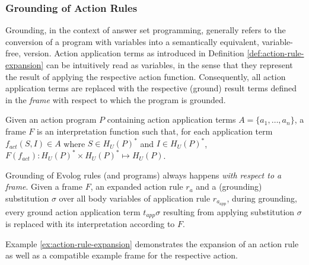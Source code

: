 \subsubsection{Grounding of Action Rules}
\label{subsubsec:evolog-actions-semantics-grounding}

Grounding, in the context of answer set programming, generally refers to the conversion of a program with variables into a semantically equivalent, variable-free, version. Action application terms as introduced in Definition \ref{def:action-rule-expansion} can be intuitively read as variables, in the sense that they represent the result of applying the respective action function. Consequently, all action application terms are replaced with the respective (ground) result terms defined in the \emph{frame} with respect to which the program is grounded.

\begin{definition}[Frame]
\label{def:evolog-frame}
Given an action program $P$ containing action application terms $A = \{a_1,\ldots,a_n\}$, a frame $F$ is an interpretation function such that, for each application term $f_{act}(S, I) \in A$ where $S \in H_{U}(P)^{*}$ and $I \in H_{U}(P)^{*}$, $F(f_{act}): H_{U}(P)^{*} \times H_{U}(P)^{*} \mapsto H_{U}(P)$.
\end{definition}

\begin{definition}
\label{def:evolog-grounding}
Grounding of Evolog rules (and programs) always happens \emph{with respect to a frame}. Given a frame $F$, an expanded action rule $r_a$ and a (grounding) substitution $\sigma$ over all body variables of application rule $r_{a_{app}}$, during grounding, every ground action application term $t_{app}\sigma$ resulting from applying substitution $\sigma$ is replaced with its interpretation according to $F$.
\end{definition}

Example \ref{ex:action-rule-expansion} demonstrates the expansion of an action rule as well as a compatible example frame for the respective action.


